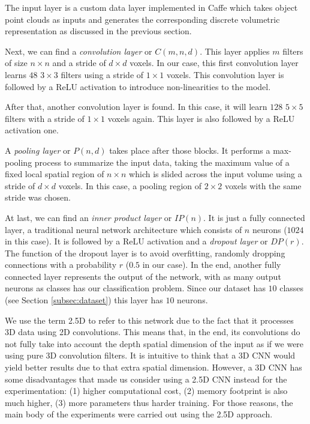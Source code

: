 The input layer is a custom data layer implemented in Caffe which takes object point clouds as inputs and generates the corresponding discrete volumetric representation as discussed in the previous section.

Next, we can find a \emph{convolution layer} or $C(m, n, d)$. This layer applies $m$ filters of size $n\times n$ and a stride of $d\times d$ voxels. In our case, this first convolution layer learns $48$ $3\times3$ filters using a stride of $1\times 1$ voxels. This convolution layer is followed by a \ac{ReLU} activation to introduce non-linearities to the model.

After that, another convolution layer is found. In this case, it will learn $128$ $5\times5$ filters with a stride of $1\times 1$ voxels again. This layer is also followed by a \ac{ReLU} activation one.

A \emph{pooling layer} or $P(n, d)$ takes place after those blocks. It performs a max-pooling process to summarize the input data, taking the maximum value of a fixed local spatial region of $n\times n$ which is slided across the input volume using a stride of $d \times d$ voxels. In this case, a pooling region of $2\times 2$ voxels with the same stride was chosen.

At last, we can find an \emph{inner product layer} or $IP(n)$. It is just a fully connected layer, a traditional neural network architecture which consists of $n$ neurons ($1024$ in this case). It is followed by a \acs{ReLU} activation and a \emph{dropout layer} \cite{Srivastava2014} or $DP(r)$. The function of the dropout layer is to avoid overfitting, randomly dropping connections with a probability $r$ ($0.5$ in our case). In the end, another fully connected layer represents the output of the network, with as many output neurons as classes has our classification problem. Since our dataset has $10$ classes (see Section \ref{subsec:dataset}) this layer has $10$ neurons.

We use the term \acs{2.5D} to refer to this network due to the fact that it processes \acs{3D} data using \acs{2D} convolutions. This means that, in the end, its convolutions do not fully take into account the depth spatial dimension of the input as if we were using pure \acs{3D} convolution filters. It is intuitive to think that a \acs{3D} \acs{CNN} would yield better results due to that extra spatial dimension. However, a \acs{3D} \acs{CNN} has some disadvantages that made us consider using a \acs{2.5D} \acs{CNN} instead for the experimentation: (1) higher computational cost, (2) memory footprint is also much higher, (3) more parameters thus harder training. For those reasons, the main body of the experiments were carried out using the \acs{2.5D} approach.

